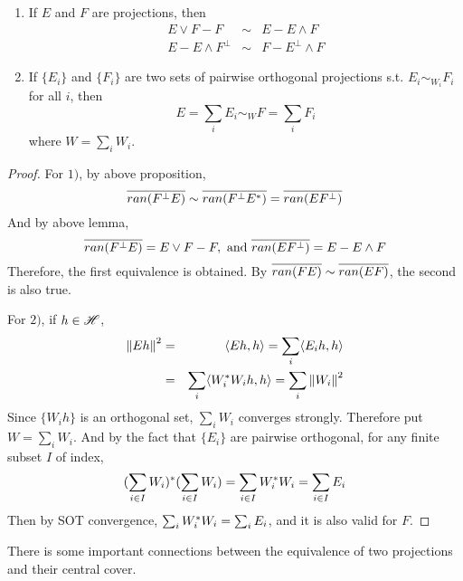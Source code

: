 \begin{prop}
	\begin{enumerate}[label = \arabic*)]
		\item If $E$ and $F$ are projections, then
			\begin{eqnarray*}
				E \vee F - F &\sim& E - E \wedge F \\
				E - E \wedge F^{\bot} &\sim& F -  E^{\bot} \wedge F 
			\end{eqnarray*}
		\item If $\{E_i\}$ and $\{F_i\}$ are two sets of pairwise orthogonal projections s.t. $E_i \sim_{W_i} F_i$ for all $i$, then
		\begin{equation*}
			E = \sum_i E_i \sim_W  F = \sum_i F_i
		\end{equation*}
		where $W =  \sum_i  W_i$.
	\end{enumerate}
\end{prop}
\begin{proof}
	For $1)$, by above proposition,
	\begin{equation*}
		\overline{ran(F^{\bot}E)}  \sim \overline{ran(F^{\bot}E^{*})} = \overline{ran(EF^{\bot})}
	\end{equation*}
	And by above lemma,
	\begin{equation*}
		\overline{ran(F^{\bot}E)} = E \vee F - F, \text{ and } \overline{ran(EF^{\bot})} = E - E \wedge F
	\end{equation*}
	Therefore, the first equivalence is obtained. By $\overline{ran(FE)} \sim \overline{ran(EF)}$, the second is also true. 
	\item For $2)$, if $h \in \mathscr{H}$,
	\begin{eqnarray*}
		\left\lVert Eh\right\lVert^2 &=&  \langle Eh,h \rangle = \sum_i \langle E_ih,h \rangle  \\
		&=& \sum_i \langle W_i^{*}W_ih,h \rangle = \sum_i \left\lVert W_i\right\lVert^2
	\end{eqnarray*}
	Since $\{W_i h\}$ is an orthogonal set, $\sum_i W_i$ converges strongly. Therefore put $W = \sum_i W_i$. And by the fact that $\{E_i\}$  are pairwise orthogonal, for any finite subset $I$  of index, 
	\begin{equation*}
		(\sum_{i \in I} W_i)^{*}(\sum_{i \in I} W_i) = \sum_{i \in I} W_i^{*}W_i = \sum_{i \in I} E_i
	\end{equation*}
	Then by SOT convergence, $\sum_i W_i^{*}W_i = \sum_i E_i$, and it is also valid for $F$.
\end{proof}

There is some important connections between the equivalence of two projections and their central cover.

